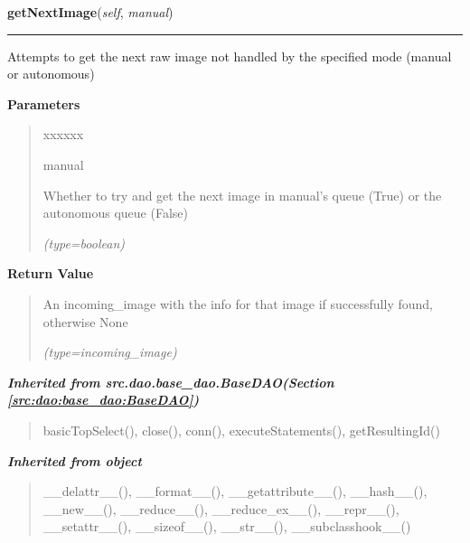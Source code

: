 \hspace{.8\funcindent}\begin{boxedminipage}{\funcwidth}

    \raggedright \textbf{getNextImage}(\textit{self}, \textit{manual})

    \vspace{-1.5ex}

    \rule{\textwidth}{0.5\fboxrule}
\setlength{\parskip}{2ex}
    Attempts to get the next raw image not handled by the specified mode 
    (manual or autonomous)

\setlength{\parskip}{1ex}
      \textbf{Parameters}
      \vspace{-1ex}

      \begin{quote}
        \begin{Ventry}{xxxxxx}

          \item[manual]

          Whether to try and get the next image in manual's queue (True) or
          the autonomous queue (False)

            {\it (type=boolean)}

        \end{Ventry}

      \end{quote}

      \textbf{Return Value}
    \vspace{-1ex}

      \begin{quote}
      An incoming\_image with the info for that image if successfully 
      found, otherwise None

      {\it (type=incoming\_image)}

      \end{quote}

    \end{boxedminipage}


\large{\textbf{\textit{Inherited from src.dao.base\_dao.BaseDAO\textit{(Section \ref{src:dao:base_dao:BaseDAO})}}}}

\begin{quote}
basicTopSelect(), close(), conn(), executeStatements(), getResultingId()
\end{quote}

\large{\textbf{\textit{Inherited from object}}}

\begin{quote}
\_\_delattr\_\_(), \_\_format\_\_(), \_\_getattribute\_\_(), \_\_hash\_\_(), \_\_new\_\_(), \_\_reduce\_\_(), \_\_reduce\_ex\_\_(), \_\_repr\_\_(), \_\_setattr\_\_(), \_\_sizeof\_\_(), \_\_str\_\_(), \_\_subclasshook\_\_()
\end{quote}

